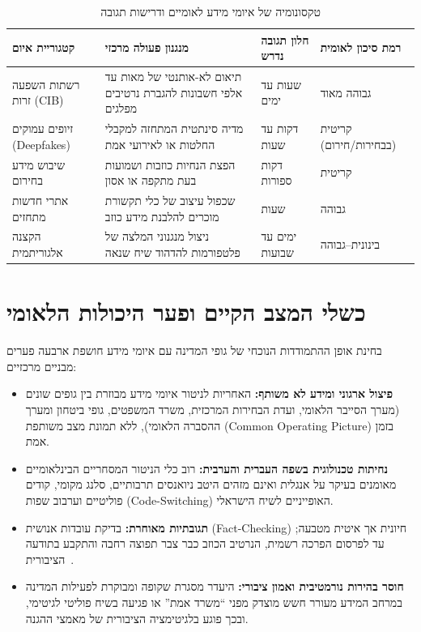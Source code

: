 \begin{table}[htbp]
\centering
\caption{טקסונומיה של איומי מידע לאומיים ודרישות תגובה}
\label{tab:threat_taxonomy}
\begin{tabularx}{\textwidth}{p{3.2cm} X p{2.4cm} p{2.4cm}}
\toprule
\textbf{קטגוריית איום} & \textbf{מנגנון פעולה מרכזי} & \textbf{חלון תגובה נדרש} & \textbf{רמת סיכון לאומית} \\
\midrule
רשתות השפעה זרות (\textenglish{CIB}) & תיאום לא-אותנטי של מאות עד אלפי חשבונות להגברת נרטיבים מפלגים & שעות עד ימים & גבוהה מאוד \\
\addlinespace
זיופים עמוקים (\textenglish{Deepfakes}) & מדיה סינתטית המתחזה למקבלי החלטות או לאירועי אמת & דקות עד שעות & קריטית (בבחירות/חירום) \\
\addlinespace
שיבוש מידע בחירום & הפצת הנחיות כוזבות ושמועות בעת מתקפה או אסון & דקות ספורות & קריטית \\
\addlinespace
אתרי חדשות מתחזים & שכפול עיצוב של כלי תקשורת מוכרים להלבנת מידע כוזב & שעות & גבוהה \\
\addlinespace
הקצנה אלגוריתמית & ניצול מנגנוני המלצה של פלטפורמות להדהוד שיח שנאה & ימים עד שבועות & בינונית--גבוהה \\
\bottomrule
\end{tabularx}
\end{table}

\section{כשלי המצב הקיים ופער היכולות הלאומי}
\label{sec:capability_gap}

בחינת אופן ההתמודדות הנוכחי של גופי המדינה עם איומי מידע חושפת ארבעה פערים מבניים מרכזיים:

\begin{itemize}
    \item \textbf{פיצול ארגוני ומידע לא משותף:} האחריות לניטור איומי מידע מבוזרת בין גופים שונים (מערך הסייבר הלאומי, ועדת הבחירות המרכזית, משרד המשפטים, גופי ביטחון ומערך ההסברה הלאומי), ללא תמונת מצב משותפת (\textenglish{Common Operating Picture}) בזמן אמת.
    \item \textbf{נחיתות טכנולוגית בשפה העברית והערבית:} רוב כלי הניטור המסחריים הבינלאומיים מאומנים בעיקר על אנגלית ואינם מזהים היטב ניואנסים תרבותיים, סלנג מקומי, קודים פוליטיים וערבוב שפות (\textenglish{Code-Switching}) האופייניים לשיח הישראלי.
    \item \textbf{תגובתיות מאוחרת:} בדיקת עובדות אנושית (\textenglish{Fact-Checking}) חיונית אך איטית מטבעה; עד לפרסום הפרכה רשמית, הנרטיב הכוזב כבר צבר תפוצה רחבה והתקבע בתודעה הציבורית~\cite{vosoughi2018spread}.
    \item \textbf{חוסר בהירות נורמטיבית ואמון ציבורי:} היעדר מסגרת שקופה ומבוקרת לפעילות המדינה במרחב המידע מעורר חשש מוצדק מפני ``משרד אמת'' או פגיעה בשיח פוליטי לגיטימי, ובכך פוגע בלגיטימציה הציבורית של מאמצי ההגנה.
\end{itemize}

